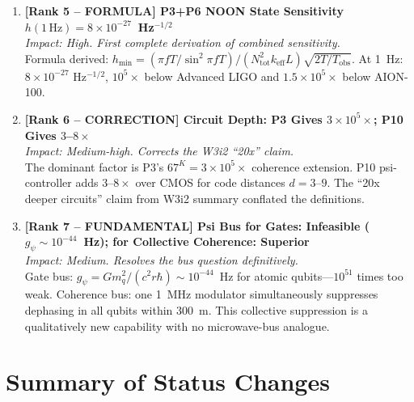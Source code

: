 \documentclass[11pt]{article}
\theoremstyle{definition}
\theoremstyle{remark}
\begin{document}
\begin{enumerate}
\item \textbf{[Rank 5 -- FORMULA] P3+P6 NOON State Sensitivity
  $h(1\,\mathrm{Hz}) = 8\times10^{-27}$~Hz$^{-1/2}$}\\
  \textit{Impact: High. First complete derivation of combined sensitivity.}\\
  Formula derived: $h_{\min} = (\pi fT/\sin^2\pi fT)/(N_{\mathrm{tot}}^2
  k_{\mathrm{eff}} L)\sqrt{2T/T_{\mathrm{obs}}}$.  At 1~Hz: $8\times10^{-27}$
  Hz$^{-1/2}$, $10^5\times$ below Advanced LIGO and
  $1.5\times10^5\times$ below AION-100.

\item \textbf{[Rank 6 -- CORRECTION] Circuit Depth: P3 Gives $3\times10^5\times$;
  P10 Gives $3$--$8\times$}\\
  \textit{Impact: Medium-high. Corrects the W3i2 ``20x'' claim.}\\
  The dominant factor is P3's $67^K = 3\times10^5\times$ coherence extension.
  P10 psi-controller adds $3$--$8\times$ over CMOS for code distances $d=3$--$9$.
  The ``20x deeper circuits'' claim from W3i2 summary conflated the definitions.

\item \textbf{[Rank 7 -- FUNDAMENTAL] Psi Bus for Gates: Infeasible
  ($g_\psi\sim10^{-44}$~Hz); for Collective Coherence: Superior}\\
  \textit{Impact: Medium. Resolves the bus question definitively.}\\
  Gate bus: $g_\psi = Gm_q^2/(c^2 r\hbar)\sim10^{-44}$~Hz for atomic
  qubits---$10^{51}$ times too weak.  Coherence bus: one 1~MHz modulator
  simultaneously suppresses dephasing in all qubits within 300~m.
  This collective suppression is a qualitatively new capability with no
  microwave-bus analogue.

\end{enumerate}

\section*{Summary of Status Changes}
\end{document}
